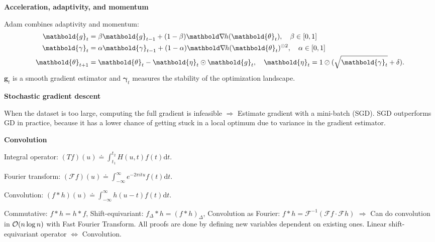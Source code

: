 \documentclass[10pt]{article}
\newenvironment{topic}[1]
{\textbf{\sffamily \footnotesize \colorbox{black}{\rlap{\textbf{\textcolor{white}{#1}}}\hspace{\linewidth}\hspace{-2\fboxsep}}}}
{}
\newenvironment{subtopic}[1]
{\begin{center}\textbf{\footnotesize \sffamily #1}\end{center}}
{}
\renewcommand{\vec}[1]{\ensuremath{\mathbold{#1}}}
\begin{document}
\begin{multicols*}{3}
\begin{topic}{Gradient-based learning}
\begin{subtopic}{Acceleration, adaptivity, and momentum}
            Adam combines adaptivity and momentum:
            \begin{align*}
                \vec{g}_t          & = \beta \vec{g}_{t-1} + (1-\beta) \grad{h(\vec{\theta}_t)}{}, \quad \beta \in [0,1]                               \\
                \vec{\gamma}_t     & = \alpha\vec{\gamma}_{t-1} + (1-\alpha) \grad{h(\vec{\theta}_t)}{}^{\odot 2}, \quad \alpha \in [0,1]              \\
                \vec{\theta}_{t+1} & = \vec{\theta}_t - \vec{\eta}_t \odot \vec{g}_t, \quad \vec{\eta}_t = 1 \oslash (\sqrt{\vec{\gamma}_t} + \delta).
            \end{align*}
            $\vec{g}_t$ is a smooth gradient estimator and $\vec{\gamma}_t$ measures the stability of the optimization landscape.
        \end{subtopic}

        \begin{subtopic}{Stochastic gradient descent}
            When the dataset is too large, computing the full gradient is infeasible $\Rightarrow$ Estimate
            gradient with a mini-batch (SGD). SGD outperforms GD in practice, because it has a lower
            chance of getting stuck in a local optimum due to variance in the gradient estimator.
        \end{subtopic}

    \end{topic}

    \begin{topic}{Convolutional networks}

        \begin{subtopic}{Convolution}
            Integral operator: $(Tf)(u) \doteq \int_{t_1}^{t_2} H(u,t) f(t) \mathrm{d}t$.

            Fourier transform: $(\mathcal{F}f)(u) \doteq \int_{-\infty}^\infty e^{-2\pi itu} f(t) \mathrm{d}t$.

            Convolution: $(f * h)(u) \doteq \int_{-\infty}^{\infty} h(u-t) f(t) \mathrm{d}t$.

            Commutative: $f * h = h * f$, Shift-equivariant: $f_{\Delta} * h = (f * h)_{\Delta}$, Convolution
            as Fourier: $f * h = \mathcal{F}^{-1}(\mathcal{F}f \cdot \mathcal{F}h)$ $\Rightarrow$ Can
            do convolution in $\bigo{n \log n}$ with Fast Fourier Transform. All proofs are done by
            defining new variables dependent on existing ones. Linear shift-equivariant operator $\iff$
            Convolution.


\end{subtopic}
\end{topic}
\end{multicols*}
\end{document}
